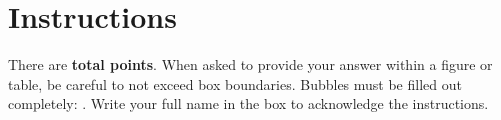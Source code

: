 \vspace*{-0.65in}
\section*{Instructions}
\vspace*{-0.1in}
There are {\bf 
{} total points}.
When asked to provide your answer within a figure or table, be careful to not
exceed box boundaries. Bubbles must be filled out completely: 
 .
Write your full name in the box to acknowledge the instructions. 
\eprob
